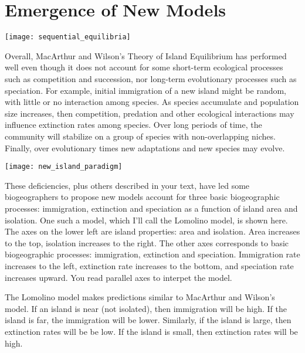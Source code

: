\documentclass{tufte-handout}
\begin{document}
\section{Emergence of New Models}
\begin{marginfigure}%
	\centering
	\texttt{[image: sequential\_equilibria]}\\
\end{marginfigure} 

Overall, MacArthur and Wilson's Theory of Island Equilibrium has performed well even though it does not account for some short-term ecological processes such as competition and succession, nor long-term evolutionary processes such as speciation. For example, initial immigration of a new island might be random, with little or no interaction among species.  As species accumulate and population size increases, then competition, predation and other ecological interactions may influence extinction rates among species. Over long periods of time, the community will stabilize on a group of species with non-overlapping niches.  Finally, over evolutionary times new adaptations and new species may evolve.

\begin{marginfigure}%
	\centering
	\texttt{[image: new\_island\_paradigm]}
\end{marginfigure} 

These deficiencies, plus others described in your text, have led some biogeographers to propose new models account for three basic biogeographic processes: immigration, extinction and speciation as a function of island area and isolation.  One such a model, which I'll call the Lomolino model, is shown here. The axes on the lower left are island properties:  area and isolation.  Area increases to the top, isolation increases to the right.  The other axes corresponds to basic biogeographic processes: immigration, extinction and speciation.  Immigration rate increases to the left, extinction rate increases to the bottom, and speciation rate increases upward. You read parallel axes to interpet the model.

The Lomolino model makes predictions similar to MacArthur and Wilson's model.  If an island is near (not isolated), then immigration will be high. If the island is far, the immigration will be lower. Similarly, if the island is large, then extinction rates will be be low. If the island is small, then extinction rates will be high.
\end{document}

